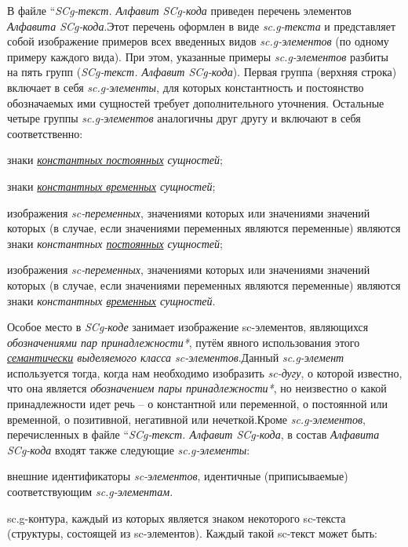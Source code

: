 \begin{SCn}
\begin{scnstruct}
\begin{scnsubstruct}
{            В файле ``\textit{SCg-текст. Алфавит SCg-кода} приведен перечень элементов \textit{Алфавита SCg-кода}.Этот перечень оформлен в виде \textit{sc.g-текста} и представляет собой изображение примеров всех введенных видов \textit{sc.g-элементов} (по одному примеру каждого вида). При этом, указанные примеры \textit{sc.g-элементов} разбиты на пять групп (\textit{SCg-текст. Алфавит SCg-кода}). Первая группа (верхняя строка) включает в себя \textit{sc.g-элементы}, для которых константность и постоянство обозначаемых ими сущностей требует дополнительного уточнения. Остальные четыре группы \textit{sc.g-элементов} аналогичны друг другу и включают в себя соответственно:\begin{scnitemize}
            \item{знаки \textit{\uline{константных постоянных} сущностей};}\item{знаки \textit{\uline{константных временных} сущностей};}\item{изображения \textit{sc-переменных}, значениями которых или значениями значений которых (в случае, если значениями переменных являются переменные) являются знаки \textit{константных \uline{постоянных} сущностей};}\item{изображения \textit{sc-переменных}, значениями которых или значениями значений которых (в случае, если значениями переменных являются переменные) являются знаки \textit{константных \uline{временных} сущностей}.}\end{scnitemize}
            Особое место в \textit{SCg-коде} занимает изображение sc-элементов, являющихся \textit{обозначениями пар принадлежности*}, путём явного использования этого \textit{\uline{семантически} выделяемого класса sc-элементов}.Данный \textit{sc.g-элемент} используется тогда, когда нам необходимо изобразить \textit{sc-дугу}, о которой известно, что она является \textit{обозначением пары принадлежности*}, но неизвестно о какой принадлежности идет речь -- о константной или переменной, о постоянной или временной, о позитивной, негативной или нечеткой.Кроме\textit{ sc.g-элементов}, перечисленных в файле ``\textit{SCg-текст. Алфавит SCg-кода}, в состав \textit{Алфавита SCg-кода} входят также следующие \textit{sc.g-элементы}:\begin{scnitemize}
            \item{внешние идентификаторы \textit{sc-элементов}, идентичные (приписываемые) соответствующим \textit{sc.g-элементам}.}\item{sc.g-контура, каждый из которых является знаком некоторого sc-текста (структуры, состоящей из sc-элементов). Каждый такой sc-текст может быть:}\begin{scnitemizeii}

\end{scnitemizeii}
\end{scnitemize}}
\end{scnsubstruct}
\end{scnstruct}
\end{SCn}
